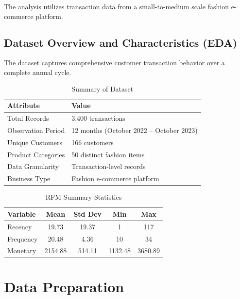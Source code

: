 \documentclass[12pt, a4paper, oneside]{report}
\begin{document}
The analysis utilizes transaction data from a small-to-medium scale fashion e-commerce platform.

\subsection{Dataset Overview and Characteristics (EDA)}

The dataset captures comprehensive customer transaction behavior over a complete annual cycle.

\begin{table}[H]
    \centering
    \caption{Summary of Dataset}
    \label{tab:dataset_summary}
    \begin{tabular}{ll}
        \toprule
        \textbf{Attribute} & \textbf{Value} \\
        \midrule
        Total Records           & 3,400 transactions \\
        Observation Period      & 12 months (October 2022 -- October 2023) \\
        Unique Customers        & 166 customers \\
        Product Categories      & 50 distinct fashion items \\
        Data Granularity        & Transaction-level records \\
        Business Type           & Fashion e-commerce platform \\
        \bottomrule
    \end{tabular}
\end{table}

\begin{table}[H]
    \centering
    \caption{RFM Summary Statistics}
    \label{tab:rfm_stats}
    \begin{tabular}{lcccc}
        \toprule
        \textbf{Variable} & \textbf{Mean} & \textbf{Std Dev} & \textbf{Min} & \textbf{Max} \\
        \midrule
        Recency     & 19.73   & 19.37  & 1       & 117 \\
        Frequency   & 20.48   & 4.36   & 10      & 34 \\
        Monetary    & 2154.88 & 514.11 & 1132.48 & 3680.89 \\
        \bottomrule
    \end{tabular}
\end{table}


\section{Data Preparation}
\end{document}
